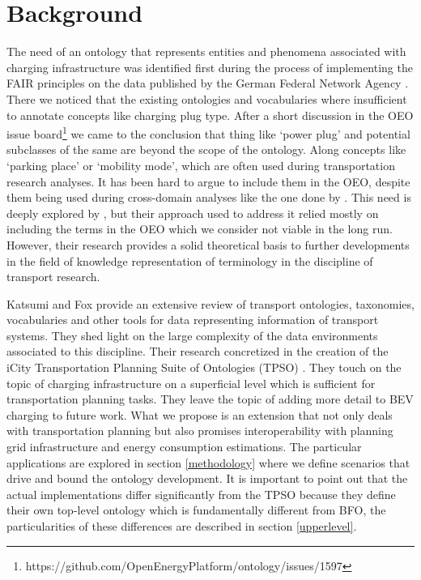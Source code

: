 ﻿\section{Background}
\label{statementofneed}
The need of an ontology that represents entities and phenomena associated with
charging infrastructure was identified first during the process of implementing
the FAIR principles on the data published by the German Federal Network Agency
\cite{ArellanoRuiz.2024}. There we noticed that the existing ontologies and
vocabularies where insufficient to annotate concepts like charging plug type.
After a short discussion in the OEO issue
board\footnote{https://github.com/OpenEnergyPlatform/ontology/issues/1597} we
came to the conclusion that thing like `power plug' and potential subclasses of
the same are beyond the scope of the ontology. Along concepts like `parking
place' or `mobility mode', which are often used during transportation research
analyses. It has been hard to argue to include them in the OEO, despite them
being used during cross-domain analyses like the one done by \cite{Hecht.2022}.
This need is deeply explored by \cite{Mittermeier.2023}, but their approach
used to address it relied mostly on including the terms in the OEO which we
consider not viable in the long run. However, their research provides a solid
theoretical basis to further developments in the field of knowledge
representation of terminology in the discipline of transport research.

Katsumi and Fox \cite{Katsumi.2018} provide an extensive review of transport
ontologies, taxonomies, vocabularies and other tools for data representing
information of transport systems. They shed light on the large complexity of
the data environments associated to this discipline. Their research concretized
in the creation of the iCity Transportation Planning Suite of Ontologies (TPSO)
\cite{Katsumi.2019}. They touch on the topic of charging infrastructure on a
superficial level which is sufficient for transportation planning tasks. They
leave the topic of adding more detail to BEV charging to future work. What we
propose is an extension that not only deals with transportation planning but
also promises interoperability with planning grid infrastructure and energy
consumption estimations. The particular applications are explored in section
\ref{methodology} where we define scenarios that drive and bound the ontology
development. It is important to point out that the actual implementations
differ significantly from the TPSO because they define their own top-level
ontology which is fundamentally different from BFO, the particularities of
these differences are described in section \ref{upperlevel}.

